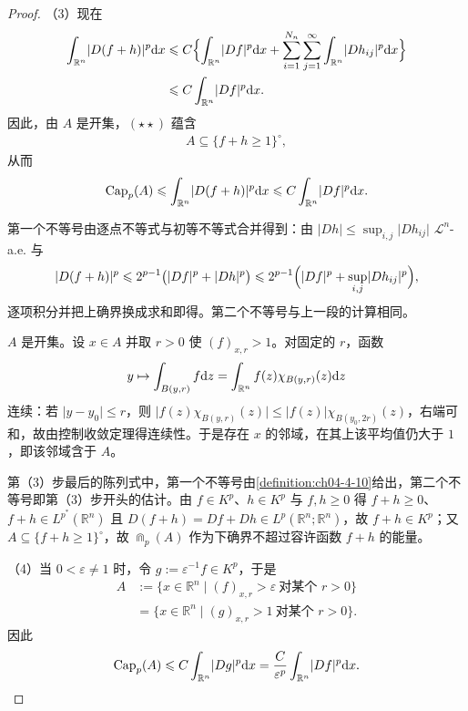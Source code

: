 \documentclass[../../main.tex]{subfiles}%
\begin{document}
\begin{proof}
（3）现在
\begin{align*}
\int_{\mathbb{R}^n}\lvert D(f+h)\rvert^p\mathrm{d} x
&\leqslant C\Bigl\{\int_{\mathbb{R}^n}\lvert Df\rvert^p\mathrm{d} x+\sum_{i=1}^{N_n}\sum_{j=1}^{\infty}\int_{\mathbb{R}^n}\lvert Dh_{ij}\rvert^p\mathrm{d} x\Bigr\}\\
&\leqslant C\int_{\mathbb{R}^n}\lvert Df\rvert^p\mathrm{d} x .
\end{align*}
因此，由 $A$ 是开集，$(\star\star)$ 蕴含
\begin{align*}
A\subseteq\{f+h\geqslant1\}^{\circ} ,
\end{align*}
从而
\begin{align*}
\operatorname{Cap}_p(A)\leqslant\int_{\mathbb{R}^n}\lvert D(f+h)\rvert^p\mathrm{d} x\leqslant C\int_{\mathbb{R}^n}\lvert Df\rvert^p\mathrm{d} x .
\end{align*}

第一个不等号由逐点不等式与初等不等式合并得到：由 $\lvert Dh\rvert\leqslant\sup_{i,j}\lvert Dh_{ij}\rvert$ $\mathcal{L}^n$-a.e. 与
\begin{align*}
\lvert D(f+h)\rvert^p\leqslant2^{p-1}\bigl(\lvert Df\rvert^p+\lvert Dh\rvert^p\bigr)\leqslant2^{p-1}\Bigl(\lvert Df\rvert^p+\sup_{i,j}\lvert Dh_{ij}\rvert^p\Bigr) ,
\end{align*}
逐项积分并把上确界换成求和即得。第二个不等号与上一段的计算相同。

$A$ 是开集。设 $x\in A$ 并取 $r>0$ 使 $(f)_{x,r}>1$。对固定的 $r$，函数
\begin{align*}
y\mapsto\int_{B(y,r)}f\mathrm{d} z=\int_{\mathbb{R}^n}f(z)\chi_{B(y,r)}(z)\mathrm{d} z
\end{align*}
连续：若 $\lvert y-y_0\rvert\leqslant r$，则 $\lvert f(z)\chi_{B(y,r)}(z)\rvert\leqslant\lvert f(z)\rvert\chi_{B(y_0,2r)}(z)$，右端可和，故由控制收敛定理得连续性。于是存在 $x$ 的邻域，在其上该平均值仍大于 $1$，即该邻域含于 $A$。

第（3）步最后的陈列式中，第一个不等号由\cref{definition:ch04-4-10}给出，第二个不等号即第（3）步开头的估计。由 $f\in K^p$、$h\in K^p$ 与 $f,h\geqslant0$ 得 $f+h\geqslant0$、$f+h\in L^{p^*}(\mathbb{R}^n)$ 且 $D(f+h)=Df+Dh\in L^p(\mathbb{R}^n;\mathbb{R}^n)$，故 $f+h\in K^p$；又 $A\subseteq\{f+h\geqslant1\}^{\circ}$，故 $\Cap_p(A)$ 作为下确界不超过容许函数 $f+h$ 的能量。%

（4）当 $0<\varepsilon\neq1$ 时，令 $g:=\varepsilon^{-1}f\in K^p$，于是
\begin{align*}
A&:=\bigl\{x\in\mathbb{R}^n\mid(f)_{x,r}>\varepsilon\ \text{对某个 }r>0\bigr\}\\
&=\bigl\{x\in\mathbb{R}^n\mid(g)_{x,r}>1\ \text{对某个 }r>0\bigr\} .
\end{align*}
因此
\begin{align*}
\operatorname{Cap}_p(A)\leqslant C\int_{\mathbb{R}^n}\lvert Dg\rvert^p\mathrm{d} x=\frac{C}{\varepsilon^p}\int_{\mathbb{R}^n}\lvert Df\rvert^p\mathrm{d} x .
\end{align*}
\end{proof}
\end{document}
